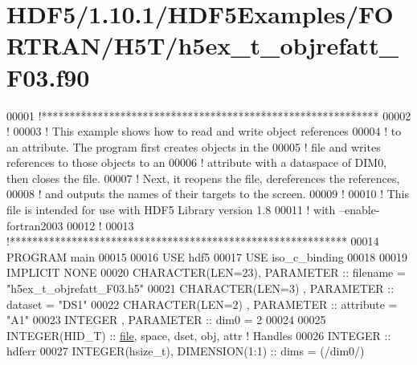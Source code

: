 \hypertarget{_h_d_f5_21_810_81_2_h_d_f5_examples_2_f_o_r_t_r_a_n_2_h5_t_2h5ex__t__objrefatt___f03_8f90_source}{}\section{H\+D\+F5/1.10.1/\+H\+D\+F5\+Examples/\+F\+O\+R\+T\+R\+A\+N/\+H5\+T/h5ex\+\_\+t\+\_\+objrefatt\+\_\+\+F03.f90}
\label{_h_d_f5_21_810_81_2_h_d_f5_examples_2_f_o_r_t_r_a_n_2_h5_t_2h5ex__t__objrefatt___f03_8f90_source}

\begin{DoxyCode}
00001 \textcolor{comment}{!************************************************************}
00002 \textcolor{comment}{!}
00003 \textcolor{comment}{!  This example shows how to read and write object references}
00004 \textcolor{comment}{!  to an attribute.  The program first creates objects in the}
00005 \textcolor{comment}{!  file and writes references to those objects to an}
00006 \textcolor{comment}{!  attribute with a dataspace of DIM0, then closes the file.}
00007 \textcolor{comment}{!  Next, it reopens the file, dereferences the references,}
00008 \textcolor{comment}{!  and outputs the names of their targets to the screen.}
00009 \textcolor{comment}{!}
00010 \textcolor{comment}{!  This file is intended for use with HDF5 Library version 1.8}
00011 \textcolor{comment}{!  with --enable-fortran2003}
00012 \textcolor{comment}{!}
00013 \textcolor{comment}{!************************************************************}
00014 \textcolor{keyword}{PROGRAM} main
00015 
00016   \textcolor{keywordtype}{USE }hdf5
00017   \textcolor{keywordtype}{USE }iso\_c\_binding
00018 
00019   \textcolor{keywordtype}{IMPLICIT NONE}
00020   \textcolor{keywordtype}{CHARACTER(LEN=23)}, \textcolor{keywordtype}{PARAMETER} :: filename  = \textcolor{stringliteral}{"h5ex\_t\_objrefatt\_F03.h5"}
00021   \textcolor{keywordtype}{CHARACTER(LEN=3)} , \textcolor{keywordtype}{PARAMETER} :: dataset   = \textcolor{stringliteral}{"DS1"}
00022   \textcolor{keywordtype}{CHARACTER(LEN=2)} , \textcolor{keywordtype}{PARAMETER} :: attribute = \textcolor{stringliteral}{"A1"}
00023   \textcolor{keywordtype}{INTEGER}          , \textcolor{keywordtype}{PARAMETER} :: dim0      = 2
00024 
00025   \textcolor{keywordtype}{INTEGER(HID\_T)}  :: \hyperlink{structfile}{file}, space, dset, obj, attr \textcolor{comment}{! Handles}
00026   \textcolor{keywordtype}{INTEGER} :: hdferr
00027   \textcolor{keywordtype}{INTEGER(hsize\_t)},   \textcolor{keywordtype}{DIMENSION(1:1)} :: dims = (/dim0/)

\end{DoxyCode}
